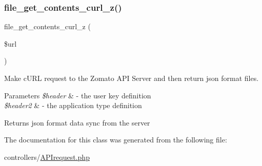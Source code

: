 \subsubsection{\texorpdfstring{file\+\_\+get\+\_\+contents\+\_\+curl\+\_\+z()}{file\_get\_contents\_curl\_z()}}
{\footnotesize\ttfamily file\+\_\+get\+\_\+contents\+\_\+curl\+\_\+z (\begin{DoxyParamCaption}\item[{}]{\$url }\end{DoxyParamCaption})}

Make c\+U\+RL request to the Zomato A\+PI Server and then return json format files. 
\begin{DoxyParams}{Parameters}
{\em \$header} & -\/ the user key definition \\
\hline
{\em \$header2} & -\/ the application type definition \\
\hline
\end{DoxyParams}
\begin{DoxyReturn}{Returns}
json format data sync from the server
\end{DoxyReturn}


The documentation for this class was generated from the following file\+:\begin{DoxyCompactItemize}
\item 
controllers/\mbox{\hyperlink{_a_p_irequest_8php}{A\+P\+Irequest.\+php}}\end{DoxyCompactItemize}
